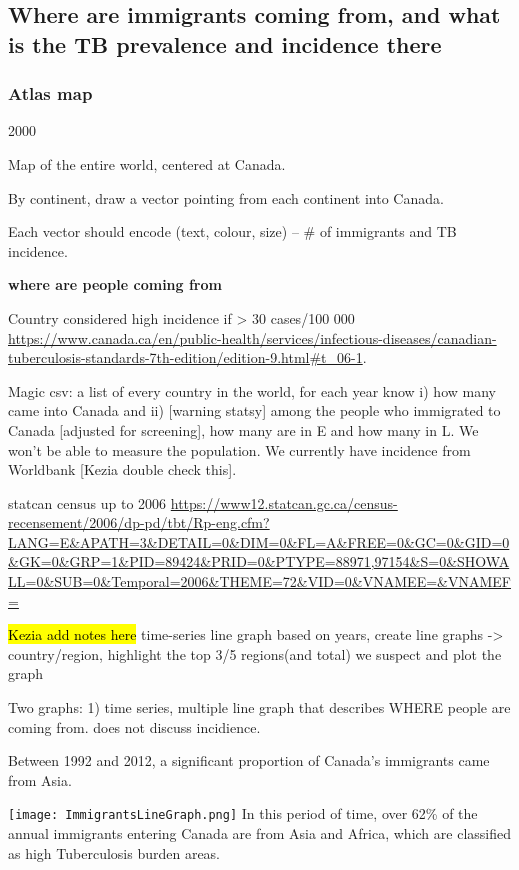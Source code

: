 \documentclass[sn-mathphys,Numbered]{sn-jnl}%
\theoremstyle{thmstyleone}%
\theoremstyle{thmstyletwo}%
\theoremstyle{thmstylethree}%
\begin{document}
\subsection{Where are immigrants coming from, and what is the TB prevalence and incidence there}

\subsubsection{Atlas map}

2000 

Map of the entire world, centered at Canada.

By continent, draw a vector pointing from each continent into Canada.

Each vector should encode (text, colour, size) -- \# of immigrants and TB incidence.



\textbf{where are people coming from}

Country considered high incidence if > 30 cases/100 000 \url{https://www.canada.ca/en/public-health/services/infectious-diseases/canadian-tuberculosis-standards-7th-edition/edition-9.html#t_06-1}. 


Magic csv:  a list of every country in the world, for each year know i) how many came into Canada and ii) [warning statsy] among the people who immigrated to Canada [adjusted for screening], how many are in E and how many in L.  We won't be able to measure the population.  We currently have incidence from Worldbank [Kezia double check this].

statcan census up to 2006
\url{https://www12.statcan.gc.ca/census-recensement/2006/dp-pd/tbt/Rp-eng.cfm?LANG=E&APATH=3&DETAIL=0&DIM=0&FL=A&FREE=0&GC=0&GID=0&GK=0&GRP=1&PID=89424&PRID=0&PTYPE=88971,97154&S=0&SHOWALL=0&SUB=0&Temporal=2006&THEME=72&VID=0&VNAMEE=&VNAMEF=}

\hl{Kezia add notes here} time-series line graph 
based on years, create line graphs -> country/region, highlight the top 3/5 regions(and total) we suspect and plot the graph

Two graphs: 1) time series, multiple line graph that describes WHERE people are coming from.  does not discuss incidience.

Between 1992 and 2012, a significant proportion of Canada’s immigrants came from Asia.

\texttt{[image: ImmigrantsLineGraph.png]}
In this period of time, over 62\% of the annual immigrants entering Canada are from Asia and Africa, which are classified as high Tuberculosis burden areas. 
\end{document}
